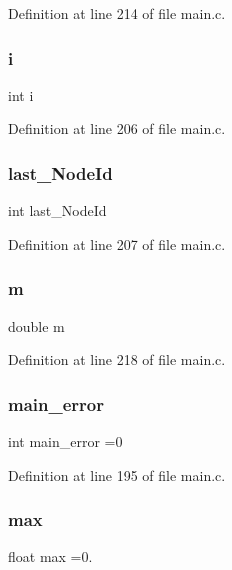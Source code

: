 Definition at line 214 of file main.\+c.

\mbox{\label{main_8c_acb559820d9ca11295b4500f179ef6392}} 
\subsubsection{i}
{\footnotesize\ttfamily int i}



Definition at line 206 of file main.\+c.

\mbox{\label{main_8c_a04cde7a88361cdfdea0c2569a0ca899e}} 
\subsubsection{last\+\_\+\+Node\+Id}
{\footnotesize\ttfamily int last\+\_\+\+Node\+Id}



Definition at line 207 of file main.\+c.

\mbox{\label{main_8c_a5175b356eac1d83a42608b42a25d00b9}} 
\subsubsection{m}
{\footnotesize\ttfamily double m}



Definition at line 218 of file main.\+c.

\mbox{\label{main_8c_a7ffc28e9156b38574a5031086c1cbf0f}} 
\subsubsection{main\+\_\+error}
{\footnotesize\ttfamily int main\+\_\+error =0}



Definition at line 195 of file main.\+c.

\mbox{\label{main_8c_a306b5ca364bf842a8ff5bbfc0b4d4a4b}} 
\subsubsection{max}
{\footnotesize\ttfamily float max =0.}



